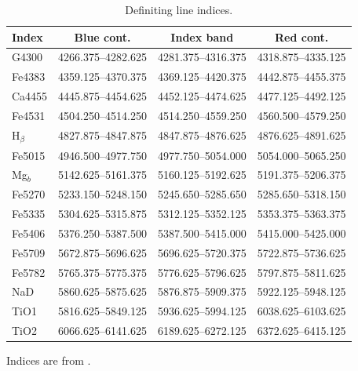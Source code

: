 {{		\begin{table}
		\begin{threeparttable}
			\centering
			\caption{Definiting line indices.}
			\label{tab:abIndex}
			\begin{tabular}{l c c c}
				\hline
				\hline
				Index 	& Blue cont. 		& Index band 		& Red cont. \\
				\hline 
				G4300 	& 4266.375--4282.625 & 4281.375--4316.375 & 4318.875--4335.125 \\
				Fe4383 	& 4359.125--4370.375 & 4369.125--4420.375 & 4442.875--4455.375 \\
				Ca4455 	& 4445.875--4454.625 & 4452.125--4474.625 & 4477.125--4492.125 \\
				Fe4531 	& 4504.250--4514.250 & 4514.250--4559.250 & 4560.500--4579.250 \\
				H$_\beta$ & 4827.875--4847.875 & 4847.875--4876.625 & 4876.625--4891.625 \\
				Fe5015 	& 4946.500--4977.750 & 4977.750--5054.000 & 5054.000--5065.250 \\
				Mg$_b$ 	& 5142.625--5161.375 & 5160.125--5192.625 & 5191.375--5206.375 \\
				Fe5270 	& 5233.150--5248.150 & 5245.650--5285.650 & 5285.650--5318.150 \\
				Fe5335 	& 5304.625--5315.875 & 5312.125--5352.125 & 5353.375--5363.375 \\
				Fe5406 	& 5376.250--5387.500 & 5387.500--5415.000 & 5415.000--5425.000 \\
				Fe5709 	& 5672.875--5696.625 & 5696.625--5720.375 & 5722.875--5736.625 \\
				Fe5782 	& 5765.375--5775.375 & 5776.625--5796.625 & 5797.875--5811.625 \\
				NaD 	& 5860.625--5875.625 & 5876.875--5909.375 & 5922.125--5948.125 \\
				TiO1 	& 5816.625--5849.125 & 5936.625--5994.125 & 6038.625--6103.625 \\
				TiO2 	& 6066.625--6141.625 & 6189.625--6272.125 & 6372.625--6415.125 \\
				\hline
				\hline
			\end{tabular}
			\begin{tablenotes}
			\footnotesize
			\item Indices are from \citet{Trager1998}.
			\end{tablenotes}
		\end{threeparttable}
		\end{table}

}}
